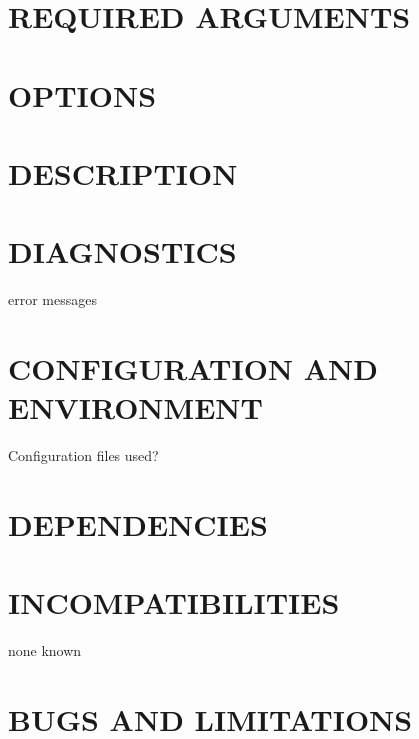 \documentclass{book}
\begin{document}
\section{REQUIRED ARGUMENTS}
\label{_REQUIRED_ARGUMENTS}
\hypertarget{_REQUIRED_ARGUMENTS}{}


\section{OPTIONS}
\label{_OPTIONS}
\hypertarget{_OPTIONS}{}


\section{DESCRIPTION}
\label{_DESCRIPTION}
\hypertarget{_DESCRIPTION}{}


\section{DIAGNOSTICS}
\label{_DIAGNOSTICS}
\hypertarget{_DIAGNOSTICS}{}



error messages


\section{CONFIGURATION AND ENVIRONMENT}
\label{_CONFIGURATION_AND_ENVIRONMENT}
\hypertarget{_CONFIGURATION_AND_ENVIRONMENT}{}



Configuration files used?


\section{DEPENDENCIES}
\label{_DEPENDENCIES}
\hypertarget{_DEPENDENCIES}{}


\section{INCOMPATIBILITIES}
\label{_INCOMPATIBILITIES}
\hypertarget{_INCOMPATIBILITIES}{}



none known


\section{BUGS AND LIMITATIONS}
\label{_BUGS_AND_LIMITATIONS}
\hypertarget{_BUGS_AND_LIMITATIONS}{}
\end{document}
